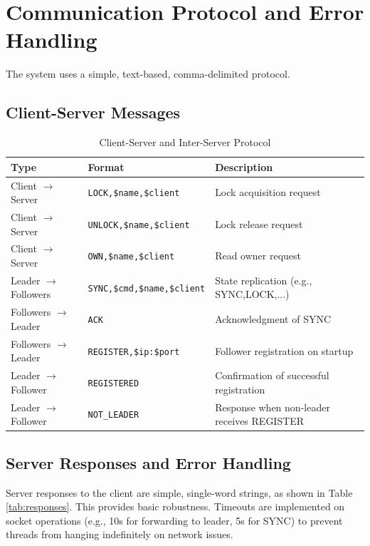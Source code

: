 \documentclass[a4paper,11pt]{article}
\begin{document}
\section{Communication Protocol and Error Handling}
The system uses a simple, text-based, comma-delimited protocol.

\subsection*{Client-Server Messages}
\begin{table}[htbp]
\centering
\caption{Client-Server and Inter-Server Protocol}
\label{tab:protocol}
\begin{tabular}{@{}lll@{}}
\toprule
\textbf{Type} & \textbf{Format} & \textbf{Description} \\
\midrule
Client $\rightarrow$ Server & \texttt{LOCK,\$name,\$client} & Lock acquisition request \\
Client $\rightarrow$ Server & \texttt{UNLOCK,\$name,\$client} & Lock release request \\
Client $\rightarrow$ Server & \texttt{OWN,\$name,\$client} & Read owner request \\
Leader $\rightarrow$ Followers & \texttt{SYNC,\$cmd,\$name,\$client} & State replication (e.g., SYNC,LOCK,...) \\
Followers $\rightarrow$ Leader & \texttt{ACK} & Acknowledgment of SYNC \\
Followers $\rightarrow$ Leader & \texttt{REGISTER,\$ip:\$port} & Follower registration on startup \\
Leader $\rightarrow$ Follower & \texttt{REGISTERED} & Confirmation of successful registration \\
Leader $\rightarrow$ Follower & \texttt{NOT\_LEADER} & Response when non-leader receives REGISTER \\
\bottomrule
\end{tabular}
\end{table}

\subsection*{Server Responses and Error Handling}
Server responses to the client are simple, single-word strings, as shown in Table \ref{tab:responses}. This provides basic robustness. Timeouts are implemented on socket operations (e.g., 10s for forwarding to leader, 5s for SYNC) to prevent threads from hanging indefinitely on network issues.
\end{document}
